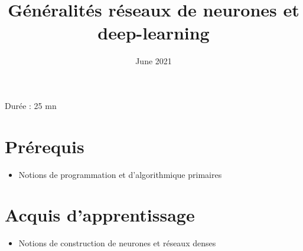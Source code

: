 \documentclass{article}
\title{Généralités réseaux de neurones et deep-learning}
\date{June 2021}
\begin{document}
\maketitle



Durée : 25 mn

\section{Prérequis}

\begin{itemize}
\item Notions de programmation et d'algorithmique primaires
\end{itemize}


\section{Acquis d'apprentissage}

\begin{itemize}
\item Notions de construction de neurones et réseaux denses
\end{itemize}
\end{document}
